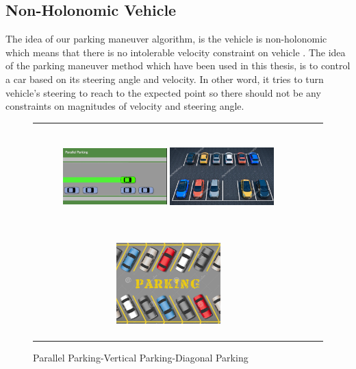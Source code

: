 \subsection{Non-Holonomic Vehicle}
The idea of our parking maneuver algorithm, is the vehicle is non-holonomic which means that there is no intolerable velocity constraint on vehicle \cite{parkingManeuver}. The idea of the parking maneuver method which have been used in this thesis, is to control a car based on its steering angle and velocity. In other word, it tries to turn vehicle's steering to reach to the expected point so there should not be any constraints on magnitudes of velocity and steering angle.
\begin{figure}
\centering
    \begin{tabular}{c|c|c}
         \includegraphics[width=4cm, height=4cm]{images/parallelParking.png} 
         \includegraphics[width=4cm, height=4cm]{images/verticalParking.png}
         \includegraphics[width=4cm, height=4cm]{images/obParking.png}
    \end{tabular}
    \caption{Parallel Parking-Vertical Parking-Diagonal Parking}
    \label{fig:parkingTypes}
\end{figure}
